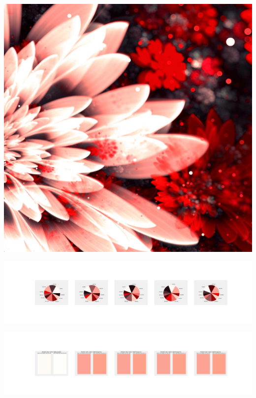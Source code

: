 \documentclass[11pt]{article}
\begin{document}
\begin{landscape}
    \begin{center}
    \includegraphics[width=\textwidth]{./nbimg/file (378).jpg}
    \end{center}

    \begin{center}
    \includegraphics[width=250mm]{./nbimg/pie-309.jpg}
    \end{center}

    \begin{center}
    \includegraphics[width=250mm]{./nbimg/peak-309.jpg}
    \end{center}
    


\end{landscape}
\end{document}
